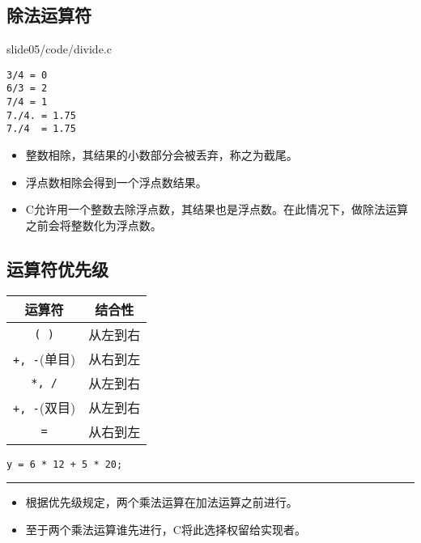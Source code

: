 \subsection{除法运算符}
\begin{frame}[fragile]\ft{\subsecname}
  
  {slide05/code/divide.c}    
\end{frame}
\begin{frame}[fragile]\ft{\subsecname}
\begin{lstlisting}[backgroundcolor=\color{red!10}]
3/4 = 0
6/3 = 2
7/4 = 1
7./4. = 1.75
7./4  = 1.75
\end{lstlisting}    
\end{frame}




\begin{frame}[fragile]\ft{\subsecname}
\begin{itemize}
\item 整数相除，其结果的小数部分会被丢弃，称之为截尾。\\[0.1in]
\item 浮点数相除会得到一个浮点数结果。\\[0.1in]
\item C允许用一个整数去除浮点数，其结果也是浮点数。在此情况下，做除法运算之前会将整数化为浮点数。
\end{itemize}
\end{frame}

\subsection{运算符优先级}
\begin{frame}[fragile]\ft{\subsecname}
\begin{table}
\centering
\begin{tabular}{c|c} \hline
运算符& 结合性\\\hline\hline
\lstinline|( )| & 从左到右 \\\hline
\lstinline|+, -|(单目) & 从右到左\\\hline
\lstinline|*, /| & 从左到右 \\\hline
\lstinline|+, -|(双目) & 从左到右 \\\hline
\lstinline|=| & 从右到左\\\hline
\end{tabular}
\end{table}
\end{frame}


\begin{frame}[fragile]\ft{\subsecname}
\begin{lstlisting}
y = 6 * 12 + 5 * 20;
\end{lstlisting}
\rule{\textwidth}{1mm}\pause 

\begin{itemize}
\item 根据优先级规定，两个乘法运算在加法运算之前进行。\\[0.1in]
\item 至于两个乘法运算谁先进行，C将此选择权留给实现者。
\end{itemize}

\end{frame}

